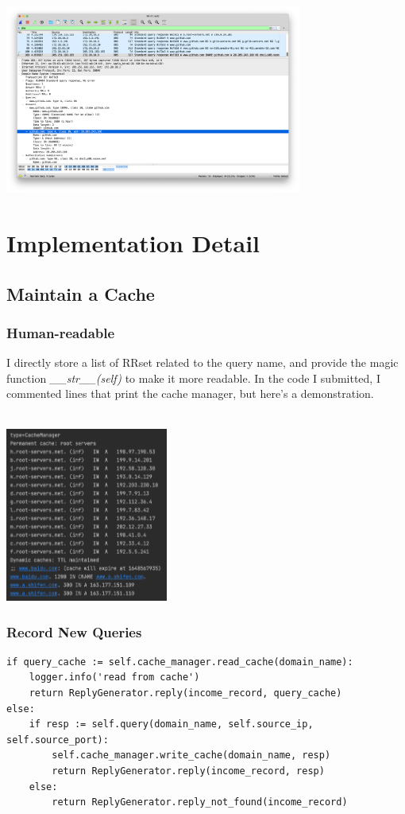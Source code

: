 \documentclass[onecolumn, oneside, ctexart]{SUSTechHomework}
\begin{document}
\centerline{\includegraphics[height=6.2cm]{fig/w3}}


\section{Implementation Detail}

\subsection{Maintain a Cache}
\subsubsection{Human-readable}
I directly store a list of RRset related to the query name, and provide the magic function \emph{\_\_str\_\_(self)} to make it more readable. In the code I submitted, I commented lines that print the cache manager, but here's a demonstration.\\~\\
\centerline{\includegraphics[width=0.4\textwidth]{fig/p111}}

\subsubsection{Record New Queries}
\begin{verbatim}
if query_cache := self.cache_manager.read_cache(domain_name):
    logger.info('read from cache')
    return ReplyGenerator.reply(income_record, query_cache)
else:
    if resp := self.query(domain_name, self.source_ip, self.source_port):
        self.cache_manager.write_cache(domain_name, resp)
        return ReplyGenerator.reply(income_record, resp)
    else:
        return ReplyGenerator.reply_not_found(income_record)
\end{verbatim}
\end{document}
